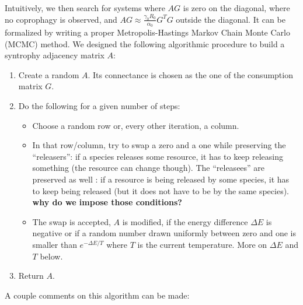 \documentclass[12pt, titlepage]{report}
\begin{document}
Intuitively, we then search for systems where $AG$ is zero on the diagonal, \ie where no coprophagy is observed, and $AG \approx \frac{\gamma_0R_0}{\alpha_0}G^TG$ outside the diagonal. It can be formalized by writing a proper Metropolis-Hastings Markov Chain Monte Carlo (MCMC) method. We designed the following algorithmic procedure to build a syntrophy adjacency matrix $A$:
\begin{enumerate}
\item Create a random $A$. Its connectance is chosen as the one of the consumption matrix $G$.
\item Do the following for a given number of steps:
\begin{itemize}
\item Choose a random row or, every other iteration, a column.
\item In that row/column, try to swap a zero and a one while preserving the ``releasers'': if a species releases some resource, it has to keep releasing something (the resource can change though). The ``releasees'' are preserved as well : if a resource is being released by some species, it has to keep being released (but it does not have to be by the same species). \textbf{why do we impose those conditions?}
\item The swap is accepted, \ie $A$ is modified, if the energy difference $\Delta E$ is negative or if a random number drawn uniformly between zero and one is smaller than $e^{-\Delta E/T}$ where $T$ is the current temperature. More on $\Delta E$ and $T$ below.
\end{itemize}
\item Return $A$.
\end{enumerate}
A couple comments on this algorithm can be made:
\end{document}
